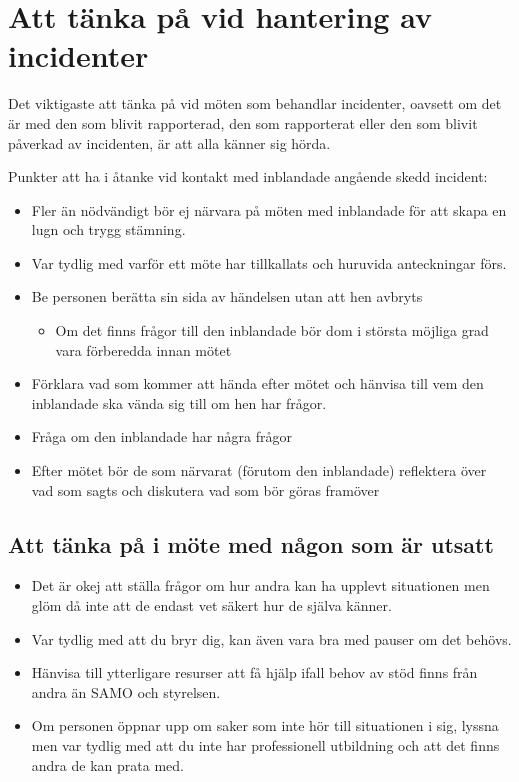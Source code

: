 \section{Att tänka på vid hantering av incidenter}
Det viktigaste att tänka på vid möten som behandlar incidenter, oavsett om det är med den som blivit rapporterad, den som rapporterat eller den som blivit påverkad av incidenten, är att alla känner sig hörda.

Punkter att ha i åtanke vid kontakt med inblandade angående skedd incident:
\begin{itemize}
    \item Fler än nödvändigt bör ej närvara på möten med inblandade för att skapa en lugn och trygg stämning.
    \item Var tydlig med varför ett möte har tillkallats och huruvida anteckningar förs.
    \item Be personen berätta sin sida av händelsen utan att hen avbryts
    \begin{itemize}
        \item Om det finns frågor till den inblandade bör dom i största möjliga grad vara förberedda innan mötet
    \end{itemize}
    \item Förklara vad som kommer att hända efter mötet och hänvisa till vem den inblandade ska vända sig till om hen har frågor.
    \item Fråga om den inblandade har några frågor
    \item Efter mötet bör de som närvarat (förutom den inblandade) reflektera över vad som sagts och diskutera vad som bör göras framöver
\end{itemize}

\subsection{Att tänka på i möte med någon som är utsatt}
\begin{itemize}
    \item Det är okej att ställa frågor om hur andra kan ha upplevt situationen men glöm då inte att de endast vet säkert hur de själva känner.
    \item Var tydlig med att du bryr dig, kan även vara bra med pauser om det behövs.
    \item Hänvisa till ytterligare resurser att få hjälp ifall behov av stöd finns från andra än SAMO och styrelsen.
    \item Om personen öppnar upp om saker som inte hör till situationen i sig, lyssna men var tydlig med att du inte har professionell utbildning och att det finns andra de kan prata med.
\end{itemize}

